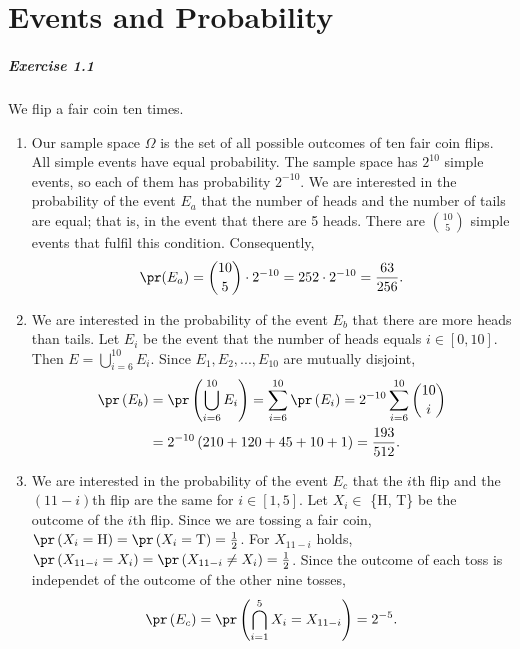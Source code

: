 \chapter{Events and Probability}

\paragraph{Exercise 1.1} We flip a fair coin ten times.
\begin{enumerate}
  \item[(a)] Our sample space $\Omega$ is the set of all possible outcomes of ten
    fair coin flips. All simple events have equal probability. The sample space has
    $2^{10}$ simple events, so each of them has probability $2^{-10}$. We are
    interested in the probability of the event $E_a$ that the number of heads and
    the number of tails are equal; that is, in the event that there are 5 heads.
    There are $\binom{10}{5}$ simple events that fulfil this condition. Consequently,
    \[
      \pr(E_a) = \binom{10}{5} \cdot 2^{-10} = 252 \cdot 2^{-10} = \frac{63}{256}.
    \]

  \item[(b)] We are interested in the probability of the event $E_b$ that there are
    more heads than tails. Let $E_i$ be the event that the number of heads equals
    $i \in [0, 10]$. Then $E = \bigcup_{i = 6}^{10} E_i$. Since $E_1, E_2,..., E_{10}$
    are mutually disjoint,
    \begin{align*}
      \pr\left(E_b\right)
        &= \pr\left(\bigcup_{i = 6}^{10} E_i \right)      = \sum_{i=6}^{10} \pr\left(E_i\right) = 2^{-10} \sum_{i=6}^{10} \binom{10}{i} \\
        &= 2^{-10} \left( 210 + 120 + 45 + 10 + 1\right)  = \frac{193}{512}.
    \end{align*}

  \item[(c)] We are interested in the probability of the event $E_c$ that the $i$th
    flip and the $(11 - i)$th flip are the same for $i \in [1,5]$. Let
    $X_i \in$ \{H, T\} be the outcome of the $i$th flip. Since we are tossing a
    fair coin, $\pr\left(X_i = \text{H} \right) = \pr\left(X_i = \text{T} \right) = \frac{1}{2}$.
    For $X_{11-i}$ holds, $\pr\left(X_{11-i} = X_i \right) = \pr\left(X_{11-i}
    \not= X_i \right) = \frac{1}{2}$. Since the outcome of each toss is independet
    of the outcome of the other nine tosses,
    \[
      \pr\left(E_c\right)
        = \pr\left(\bigcap_{i=1}^5 X_i = X_{11-i}\right)
        = 2^{-5}.
    \]


\end{enumerate}
